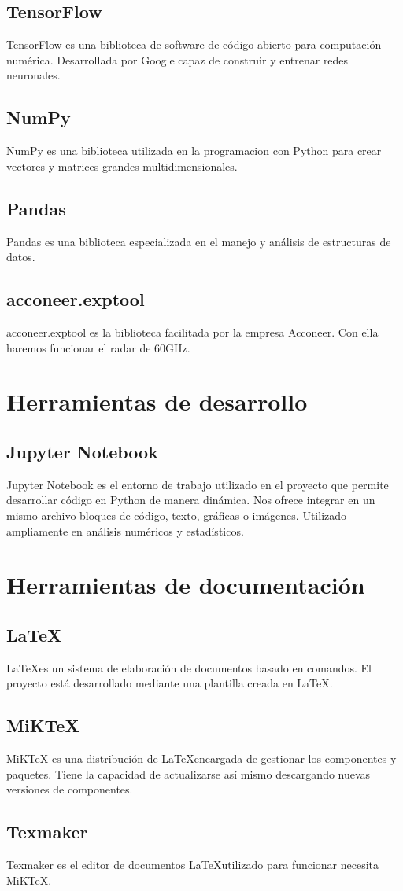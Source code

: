 \subsection{TensorFlow}
TensorFlow es una biblioteca de software de código abierto para computación numérica. Desarrollada por Google capaz de construir y entrenar redes neuronales.

\subsection{NumPy}
NumPy es una biblioteca utilizada en la programacion con Python para crear vectores y matrices grandes multidimensionales.

\subsection{Pandas}
Pandas es una biblioteca especializada en el manejo y análisis de estructuras de datos.

\subsection{acconeer.exptool}
acconeer.exptool es la biblioteca facilitada por la empresa Acconeer. Con ella haremos funcionar el radar de 60GHz.

\section{Herramientas de desarrollo}
\subsection{Jupyter Notebook}
Jupyter Notebook es el entorno de trabajo utilizado en el proyecto que permite desarrollar código en Python de manera dinámica. Nos ofrece integrar en un mismo archivo bloques de código, texto, gráficas o imágenes. Utilizado ampliamente en análisis numéricos y estadísticos.

\section{Herramientas de documentación}
\subsection{\LaTeX}
\LaTeX es un sistema de elaboración de documentos basado en comandos. El proyecto está desarrollado mediante una plantilla creada en \LaTeX.

\subsection{MiKTeX}
MiKTeX es una distribución de \LaTeX encargada de gestionar los componentes y paquetes. Tiene la capacidad de actualizarse así mismo descargando nuevas versiones de componentes.

\subsection{Texmaker}
Texmaker es el editor de documentos \LaTeX utilizado para funcionar necesita MiKTeX.
